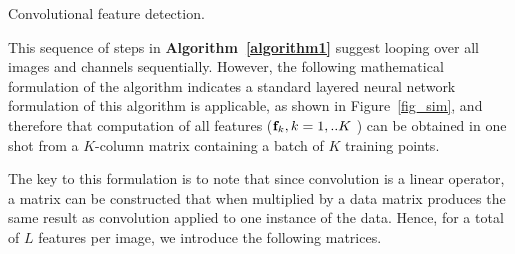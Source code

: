 \documentclass[conference]{IEEEtran}
\begin{document}
\begin{algorithm}
\caption{Convolutional feature detection.}
\BlankLine
{}
\label{algorithm1}
\end{algorithm}


This sequence of steps in  {\bf Algorithm~\ref{algorithm1}} suggest looping over all images and channels sequentially. However, the following mathematical formulation of the  algorithm indicates a standard layered neural network formulation of this algorithm is applicable, as shown in Figure~\ref{fig_sim}, and therefore that computation of all features (${\bf f}_{k},k=1,..K$ ) can be obtained in one shot from a $K$-column matrix containing a batch of $K$ training points.

The key to this formulation is to note  that since convolution is a linear operator, a matrix can be constructed that when multiplied by a data matrix produces the same result as convolution applied to one instance of the data. Hence, for a total of $L$ features per image, we introduce the following matrices. 
\end{document}
